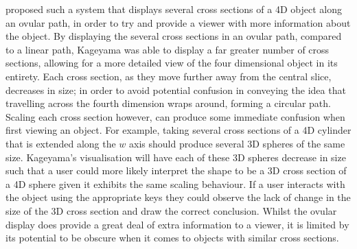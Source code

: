 \documentclass{l4proj}
\begin{document}
\citet{kageyama_visualization_2015} proposed such a system that displays several cross sections of a 4D object along an ovular path, in order to try and provide a viewer with more information about the object. 
%
By displaying the several cross sections in an ovular path, compared to a linear path, Kageyama was able to display a far greater number of cross sections, allowing for a more detailed view of the four dimensional object in its entirety.
%
Each cross section, as they move further away from the central slice, decreases in size; in order to avoid potential confusion in conveying the idea that travelling across the fourth dimension wraps around, forming a circular path.
%
Scaling each cross section however, can produce some immediate confusion when first viewing an object. For example, taking several cross sections of a 4D cylinder that is extended along the \(w\) axis should produce several 3D spheres of the same size. Kageyama's visualisation will have each of these 3D spheres decrease in size such that a user could more likely interpret the shape to be a 3D cross section of a 4D sphere given it exhibits the same scaling behaviour. If a user interacts with the object using the appropriate keys they could observe the lack of change in the size of the 3D cross section and draw the correct conclusion.
Whilst the ovular display does provide a great deal of extra information to a viewer, it is limited by its potential to be obscure when it comes to objects with similar cross sections.
\end{document}
